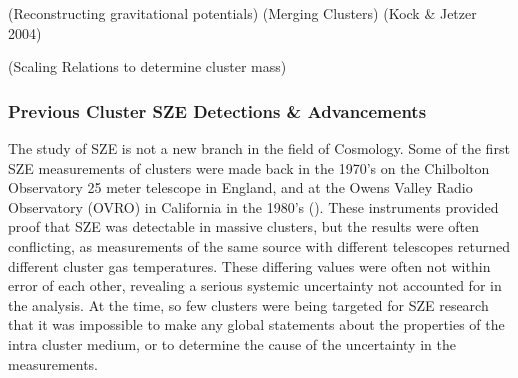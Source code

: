 \documentclass[manuscript]{aastex}
\begin{document}


(Reconstructing gravitational potentials)
(Merging Clusters) 
   (Kock \& Jetzer 2004)
    
(Scaling Relations to determine cluster mass) 


\subsubsection{Previous Cluster SZE Detections \& Advancements}

The study of SZE is not a new branch in the field of Cosmology. Some of the first SZE measurements of clusters were made back in the 1970's on the Chilbolton Observatory 25 meter telescope in England, and at the Owens Valley Radio Observatory (OVRO) in California in the 1980's (\cite{Birkinshaw1999}). These instruments provided proof that SZE was detectable in massive clusters, but the results were often conflicting, as measurements of the same source with different telescopes returned different cluster gas temperatures. These differing values were often not within error of each other, revealing a serious systemic uncertainty not accounted for in the analysis. At the time, so few clusters were being targeted for SZE research that it was impossible to make any global statements about the properties of the intra cluster medium, or to determine the cause of the uncertainty in the measurements. 
\end{document}
